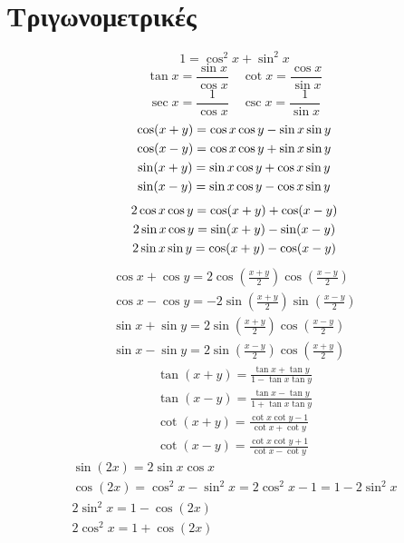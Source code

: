 \documentclass{article}
\begin{document}
\section{Τριγωνομετρικές}
\[
    1 = \cos^2x + \sin^2x
\] 
\[
\tan x = \frac{\sin x}{\cos x} \quad \cot x = \frac{\cos x}{\sin x}
\] 
\[
\sec x = \frac{1}{\cos x} \quad \csc x = \frac{1}{\sin x}
\] 
\begin{gather}
    \cos (x+y) = \cos x\cos y - \sin x \sin y \notag\\
    \cos (x-y) = \cos x\cos y + \sin x \sin y \notag\\
    \sin (x+y) = \sin x\cos y + \cos x \sin y \notag\\
    \sin (x-y) = \sin x\cos y - \cos x \sin y \notag
\end{gather}
\begin{gather}
    2\cos x \cos y = \cos (x+y) + \cos (x-y) \notag\\
    2\sin x \cos y = \sin (x+y) - \sin (x-y) \notag\\
    2\sin x \sin y = \cos (x+y) - \cos (x-y) \notag 
\end{gather}
\begin{gather*}
    \cos x + \cos y = 2\cos \left(\frac{x+y}{2}\right)\cos \left(\frac{x-y}{2}\right) \\
    \cos x - \cos y = -2\sin\left(\frac{x+y}{2}\right)\sin \left(\frac{x-y}{2}\right) \\
    \sin x + \sin y = 2\sin \left(\frac{x+y}{2}\right)\cos \left(\frac{x-y}{2}\right) \\
    \sin x - \sin y = 2\sin \left(\frac{x-y}{2}\right)\cos \left(\frac{x+y}{2}\right) 
\end{gather*} 
\begin{gather*}
    \tan (x+y) = \frac{\tan x + \tan y}{1 - \tan x \tan y} \\
    \tan (x-y) = \frac{\tan x - \tan y}{1 + \tan x \tan y} \\
    \cot (x+y) = \frac{\cot x \cot y - 1}{\cot x + \cot y} \\
    \cot (x-y) = \frac{\cot x \cot y + 1}{\cot x - \cot y}
\end{gather*}
\begin{gather*}
    \sin(2x) = 2\sin x\cos x \\
    \cos(2x) = \cos ^2x - \sin ^2x = 2\cos ^2x - 1 = 1 - 2\sin ^2x \\
    2\sin^2x = 1 - \cos(2x) \\
    2\cos^2x = 1 + \cos(2x) 
\end{gather*}
\end{document}
